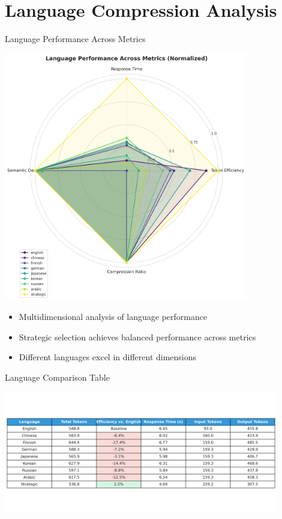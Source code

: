 \documentclass{beamer}
\begin{document}
\section{Language Compression Analysis}

\begin{frame}{Language Performance Across Metrics}
    \begin{center}
        \includegraphics[width=0.8\textwidth]{visualizations/presentation/language_radar_chart.png}
    \end{center}
    
    \begin{itemize}
        \item Multidimensional analysis of language performance
        \item Strategic selection achieves balanced performance across metrics
        \item Different languages excel in different dimensions
    \end{itemize}
\end{frame}

\begin{frame}{Language Comparison Table}
    \begin{center}
        \includegraphics[width=0.9\textwidth]{visualizations/presentation/language_comparison_table.png}
    \end{center}
\end{frame}
\end{document}
